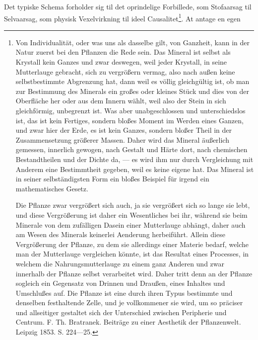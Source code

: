 \documentclass[12pt,a4paper]{book}
\begin{document}
Det typiske Schema forholder sig til det oprindelige Forbillede, som
Stofaarsag til Selvaarsag, som physisk Vexelvirkning til ideel
Causalitet\footnote{Von Individualität, oder was uns als dasselbe gilt,
von Ganzheit, kann in der Natur zuerst bei den Pflanzen die Rede sein.
Das Mineral ist selbst als Krystall kein Ganzes und zwar deswegen, weil
jeder Krystall, in seine Mutterlauge gebracht, sich zu vergrößern
vermag, also nach außen keine selbstbestimmte Abgrenzung hat, dann weil
es völlig gleichgültig ist, ob man zur Bestimmung des Minerals ein großes
oder kleines Stück und dies von der Oberfläche her oder aus dem Innern
wählt, weil also der Stein in sich gleichförmig, unbegrenzt ist. Was
aber unabgeschlossen und unterschiedslos ist, das ist kein Fertiges,
sondern bloßes Moment im Werden eines Ganzen, und zwar hier der Erde, es
ist kein Ganzes, sondern bloßer Theil in der Zusammensetzung größerer
Massen. Daher wird das Mineral äußerlich gemessen, innerlich gewogen,
nach Gestalt und Härte dort, nach chemischen Bestandtheilen und der
Dichte da, --- es wird ihm nur durch Vergleichung mit Anderem eine
Bestimmtheit gegeben, weil es keine eigene hat. Das Mineral ist in
seiner selbständigsten Form ein bloßes Beispiel für irgend ein
mathematisches Gesetz.
\par Die Pflanze zwar vergrößert sich auch, ja sie vergrößert sich so
lange sie lebt, und diese Vergrößerung ist daher ein Wesentliches bei
ihr, während sie beim Minerale von dem zufälligen Dasein einer
Mutterlauge abhängt, daher auch am Wesen des Minerals keinerlei Aenderung
herbeiführt. Allein diese Vergrößerung der Pflanze, zu dem sie
allerdings einer Materie bedarf, welche man der Mutterlauge vergleichen
könnte, ist das Resultat eines Processes, in welchem die
Nahrungsmutterlauge zu einem ganz Anderen und zwar innerhalb der Pflanze
selbst verarbeitet wird. Daher tritt denn an der Pflanze sogleich ein
Gegensatz von Drinnen und Draußen, eines Inhaltes und Umschlußes auf.
Die Pflanze ist eine durch ihren Typus bestimmte und denselben
festhaltende Zelle, und je vollkommener sie wird, um so präciser und
allseitiger gestaltet sich der Unterschied zwischen Peripherie und
Centrum. F. Th. Bratranek. Beiträge zu einer Aesthetik der
Pflanzenwelt. Leipzig 1853. S. 224---25.}. At antage en egen
\end{document}
